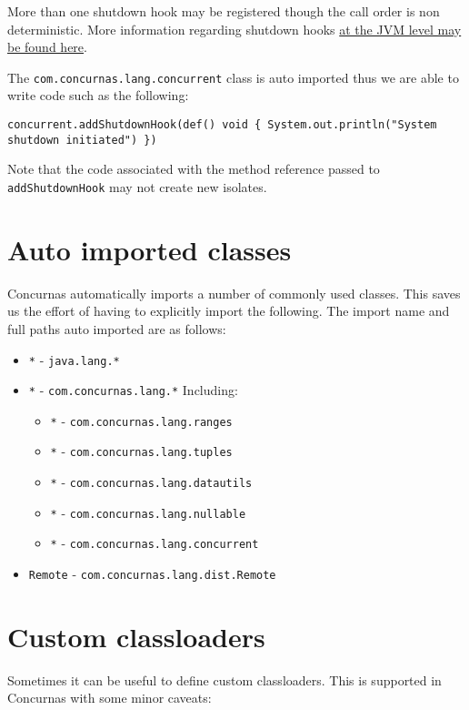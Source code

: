 \documentclass[conc-doc]{subfiles}
\begin{document}
More than one shutdown hook may be registered though the call order is non deterministic. More information regarding shutdown hooks \href{https://docs.oracle.com/javase/8/docs/api/java/lang/Runtime.html#addShutdownHook-java.lang.Thread-}{at the JVM level may be found here}.

The \lstinline{com.concurnas.lang.concurrent} class is auto imported thus we are able to write code such as the following:

\begin{lstlisting}
concurrent.addShutdownHook(def() void { System.out.println("System shutdown initiated") })
\end{lstlisting}

Note that the code associated with the method reference passed to \lstinline{addShutdownHook} may not create new isolates.

\section{Auto imported classes}
Concurnas automatically imports a number of commonly used classes. This saves us the effort of having to explicitly import the following. The import name and full paths auto imported are as follows:

\begin{itemize}
	\item \lstinline{*} - \lstinline{java.lang.*}
	\item \lstinline{*} - \lstinline{com.concurnas.lang.*} Including:
	\begin{itemize}
		\item \lstinline{*} - \lstinline{com.concurnas.lang.ranges}
		\item \lstinline{*} - \lstinline{com.concurnas.lang.tuples}
		\item \lstinline{*} - \lstinline{com.concurnas.lang.datautils}
		\item \lstinline{*} - \lstinline{com.concurnas.lang.nullable}
		\item \lstinline{*} - \lstinline{com.concurnas.lang.concurrent}
	\end{itemize}
	\item \lstinline{Remote} - \lstinline{com.concurnas.lang.dist.Remote}
\end{itemize}

\section{Custom classloaders}
Sometimes it can be useful to define custom classloaders. This is supported in Concurnas with some minor caveats:
\end{document}
